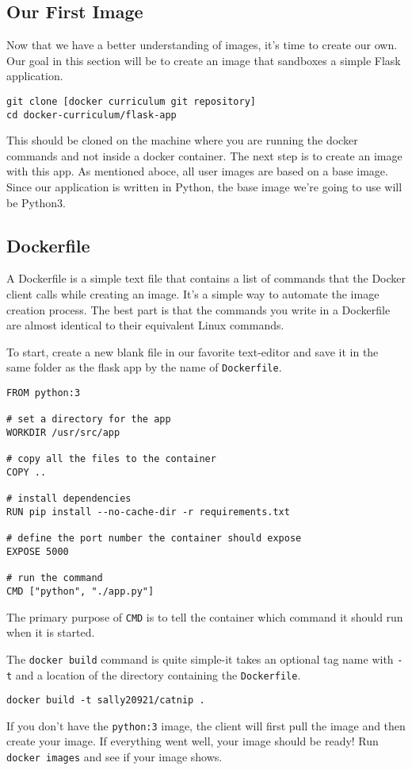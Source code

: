 \documentclass[twoside,twocolumn]{article}
\begin{document}
\subsection{Our First Image}
Now that we have a better understanding of images, it's time to create our own.
Our goal in this section will be to create an image that sandboxes a simple Flask application.
\begin{verbatim}
git clone [docker curriculum git repository]
cd docker-curriculum/flask-app
\end{verbatim}
This should be cloned on the machine where you are running the docker commands and not inside a docker container.
The next step is to create an image with this app. As mentioned aboce, all user images are based on a base image.
Since our application is written in Python, the base image we're going to use will be Python3.

\subsection{Dockerfile}
A Dockerfile is a simple text file that contains a list of commands that the Docker client calls while creating an image.
It's a simple way to automate the image creation process.
The best part is that the commands you write in a Dockerfile are almost identical to their equivalent Linux commands.

To start, create a new blank file in our favorite text-editor and save it in the same folder as the flask app by the name of \texttt{Dockerfile}.
\begin{verbatim}
FROM python:3

# set a directory for the app
WORKDIR /usr/src/app 

# copy all the files to the container
COPY ..

# install dependencies
RUN pip install --no-cache-dir -r requirements.txt

# define the port number the container should expose
EXPOSE 5000

# run the command
CMD ["python", "./app.py"]
\end{verbatim}
The primary purpose of \texttt{CMD} is to tell the container which command it should run when it is started.

The \texttt{docker build} command is quite simple-it takes an optional tag name with \texttt{-t} and a location of the directory containing the \texttt{Dockerfile}.
\begin{verbatim}
docker build -t sally20921/catnip .
\end{verbatim}
If you don't have the \texttt{python:3} image, the client will first pull the image and then create your image.
If everything went well, your image should be ready! Run \texttt{docker images} and see if your image shows.
\end{document}
